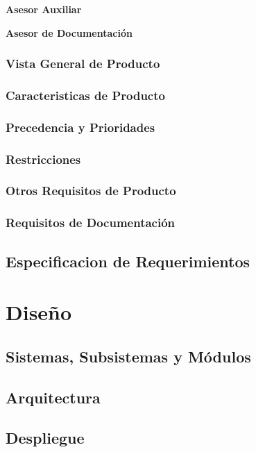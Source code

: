 \textbf{Asesor Auxiliar}

\textbf{Asesor de Documentación}

\subsubsection{Vista General de Producto}
\subsubsection{Caracteristicas de Producto}
\subsubsection{Precedencia y Prioridades}
\subsubsection{Restricciones}
\subsubsection{Otros Requisitos de Producto}
\subsubsection{Requisitos de Documentación}

\subsection{Especificacion de Requerimientos}

\section{Diseño}

\subsection{Sistemas, Subsistemas y Módulos}

\subsection{Arquitectura}

\subsection{Despliegue}
